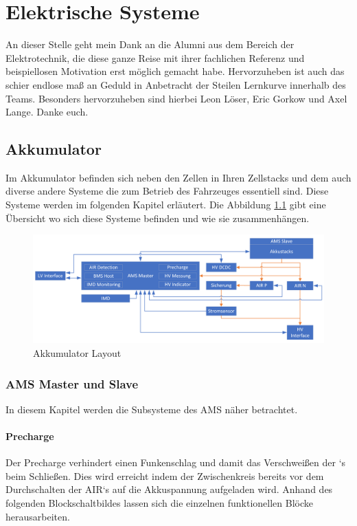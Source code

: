 
\chapter{Elektrische Systeme}
An dieser Stelle geht mein Dank an die Alumni aus dem Bereich der Elektrotechnik, die diese ganze Reise mit ihrer fachlichen Referenz und beispiellosen Motivation erst möglich gemacht habe. Hervorzuheben ist auch das schier endlose maß an Geduld in Anbetracht der Steilen Lernkurve innerhalb des Teams. Besonders hervorzuheben sind hierbei Leon Löser, Eric Gorkow und Axel Lange. Danke euch.
\FloatBarrier
\section{Akkumulator}
Im Akkumulator befinden sich neben den Zellen in Ihren Zellstacks und dem  auch diverse andere Systeme die zum Betrieb des Fahrzeuges essentiell sind. Diese Systeme werden im folgenden Kapitel erläutert. Die Abbildung \ref{fig:accumulator-layout} gibt eine Übersicht wo sich diese Systeme befinden und wie sie zusammenhängen.

\begin{figure}
	\centering
	\includegraphics[width=0.9\linewidth]{"bilder/Accumulator Layout"}
	\caption{Akkumulator Layout}
	\label{fig:accumulator-layout}
\end{figure}

\FloatBarrier
\subsection{\ac{AMS} Master und Slave}
In diesem Kapitel werden die Subsysteme des \ac{AMS} näher betrachtet.
\FloatBarrier

\subsubsection{Precharge}
Der Precharge verhindert einen Funkenschlag und damit das Verschweißen der `s beim Schließen. Dies wird erreicht indem der Zwischenkreis bereits vor dem Durchschalten der \ac{AIR}`s auf die Akkuspannung aufgeladen wird. Anhand des folgenden Blockschaltbildes lassen sich die einzelnen funktionellen Blöcke herausarbeiten.

